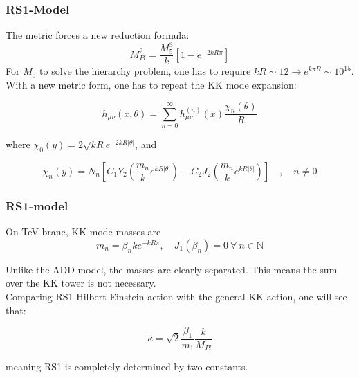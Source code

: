 \documentclass[10pt]{beamer}
\begin{document}
	\begin{frame}
		\frametitle{RS1-Model}
		The metric forces a new reduction formula:
		\begin{equation}
			M_{Pl}^2 = \frac{M_5^3}{k}\left[1-e^{-2kR\pi}\right]
		\end{equation}
		For $M_5$ to solve the hierarchy problem, one has to require $kR \sim 12 \rightarrow e^{k\pi R} \sim 10^{15}$.\\
		
		With a new metric form, one has to repeat the KK mode expansion:
		
		\begin{equation}
			h_{\mu\nu}(x,\theta) = \sum_{n=0}^\infty h_{\mu\nu}^{(n)}(x)\frac{\chi_n(\theta)}{R}
		\end{equation}
		
		where $\chi_0(y) = 2\sqrt{kR}e^{-2kR|\theta|}$, and
		
		\begin{equation}
			\chi_n(y) = N_n\left[ C_1Y_2\left(\frac{m_n}{k}e^{kR|\theta|}\right) +   C_2J_2\left(\frac{m_n}{k}e^{kR|\theta|}\right)\right] \quad,\quad n\neq 0
		\end{equation}
	\end{frame}
	
	\begin{frame}
		\frametitle{RS1-model}
		On TeV brane, KK mode masses are
		\begin{equation}
			m_n = \beta_n ke^{-kR\pi}, \quad J_1(\beta_n) = 0\:\forall\: n\in\mathbb{N}
		\end{equation}
		
		Unlike the ADD-model, the masses are clearly separated. This means the sum over the KK tower is not necessary.\\
		Comparing RS1 Hilbert-Einstein action with the general KK action, one will see that:
		
		\begin{equation}
			\kappa = \sqrt{2}\frac{\beta_1}{m_1}\frac{k}{M_{Pl}}
		\end{equation}
		
		meaning RS1 is completely determined by two constants.
	\end{frame}
	
\end{document}
